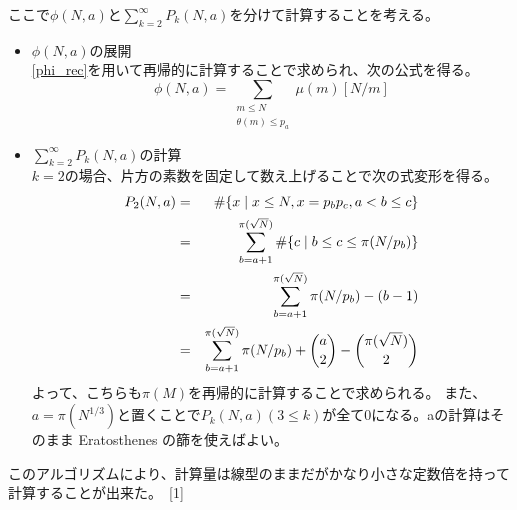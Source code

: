 \documentclass[a4paper]{jsarticle}
\begin{document}

ここで$\phi(N,a)$と$\displaystyle \sum_{k=2}^\infty P_k(N,a)$を分けて計算することを考える。
\begin{itemize}
    \item $\phi(N,a)$の展開 \\
    \eqref{phi_rec}を用いて再帰的に計算することで求められ、次の公式を得る。
    \begin{equation}
        \displaystyle
        \phi(N,a)=\sum_{\substack{m \leq N \\ \theta(m) \leq p_a}} \mu(m) [N/m]
        \label{phi_sum}
    \end{equation}
    \item $\displaystyle \sum_{k=2}^\infty P_k(N,a)$の計算 \\
    $k=2$の場合、片方の素数を固定して数え上げることで次の式変形を得る。
    \begin{eqnarray}
        \displaystyle
        P_2(N,a)&=&\#\{x \mid x \leq N,x=p_b p_c,a<b \leq c\} \notag \\
        &=&\sum_{b=a+1}^{\pi(\sqrt{N})} \#\{c \mid b \leq c \leq \pi(N/p_b)\} \notag \\
        &=&\sum_{b=a+1}^{\pi(\sqrt{N})} {\pi(N/p_b)-(b-1)} \notag \\
        &=&\sum_{b=a+1}^{\pi(\sqrt{N})} \pi(N/p_b)+ \binom{a}{2}- \binom{\pi(\sqrt{N})}{2}
        \label{pi_rec}
    \end{eqnarray}
    よって、こちらも$\pi(M)$を再帰的に計算することで求められる。
    また、$a=\pi(N^{1/3})$と置くことで$P_k(N,a) (3 \leq k)$が全て0になる。aの計算はそのまま Eratosthenes の篩を使えばよい。
\end{itemize}
このアルゴリズムにより、計算量は線型のままだがかなり小さな定数倍を持って計算することが出来た。~[1]
\end{document}
